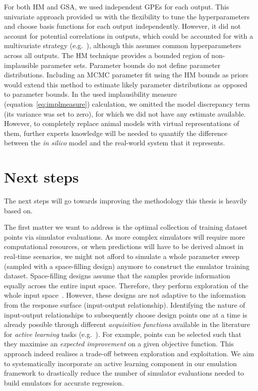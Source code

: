 \vspace{0.2cm}
For both HM and GSA, we used independent GPEs for each output. This univariate approach provided us with the flexibility to tune the hyperparameters and choose basis functions for each output independently. However, it did not account for potential correlations in outputs, which could be accounted for with a multivariate strategy (e.g.~\cite{Conti:2009}), although this assumes common hyperparameters across all outputs. The HM technique provides a bounded region of non-implausible parameter sets. Parameter bounds do not define parameter distributions. Including an MCMC parameter fit using the HM bounds as priors would extend this method to estimate likely parameter distributions as opposed to parameter bounds. In the used implausibility measure (equation~\eqref{eq:implmeasure}) calculation, we omitted the model discrepancy term (its variance was set to zero), for which we did not have any estimate available. However, to completely replace animal models with virtual representations of them, further experts knowledge will be needed to quantify the difference between the \textit{in silico} model and the real-world system that it represents.


%
%
%
\section{Next steps}\label{sec:ch9next_steps}
The next steps will go towards improving the methodology this thesis is heavily based on.

\vspace{0.2cm}
The first matter we want to address is the optimal collection of training dataset points via simulator evaluations. As more complex simulators will require more computational resources, or when predictions will have to be derived almost in real-time scenarios, we might not afford to simulate a whole parameter sweep (sampled with a space-filling design) anymore to construct the emulator training dataset. Space-filling designs assume that the samples provide information equally across the entire input space. Therefore, they perform exploration of the whole input space~\cite{Yue:2021}. However, these designs are not adaptive to the information from the response surface (input-output relationship). Identifying the nature of input-output relationships to subsequently choose design points one at a time is already possible through different \textit{acquisition functions} available in the literature for \textit{active learning} tasks (e.g.~\cite{Jones:1998,Pasolli:2011,Schreiter:2015}). For example, points can be selected such that they maximise an \textit{expected improvement} on a given objective function. This approach indeed realises a trade-off between exploration and exploitation. We aim to systematically incorporate an active learning component in our emulation framework to drastically reduce the number of simulator evaluations needed to build emulators for accurate regression.

